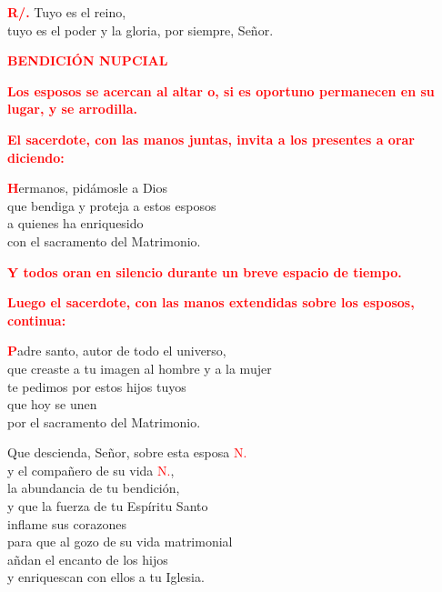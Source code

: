 \documentclass[12pt, letterpaper, spanish]{report}
\begin{document}
\Large \hspace{-0.9cm} {\bfseries \textcolor{red}{R/.}} \hspace{0.5cm} Tuyo es el reino,\\
tuyo es el poder y la gloria, por siempre, Se\~nor.\newline

\newpage

\Large {\bfseries \textcolor{red}{BENDICI\'ON NUPCIAL}} \newline

\large{\bfseries \textcolor{red}{Los esposos se acercan al altar o,
si es oportuno permanecen en su lugar, y se arrodilla.}}\newline

\large{\bfseries \textcolor{red}{El sacerdote, con las manos juntas, invita a los presentes a orar diciendo:}}

\Large \lettrine[lines=1]{\bfseries \textcolor{red}{H}}{}ermanos, pid\'amosle a Dios\\
que bendiga y proteja a estos esposos\\
a quienes ha enriquesido\\
con el sacramento del Matrimonio.\newline

\large{\bfseries \textcolor{red}{Y todos oran en silencio durante un breve espacio de tiempo.}}\newline

\large{\bfseries \textcolor{red}{Luego el sacerdote, con las manos extendidas sobre los esposos, continua:}}

\Large \lettrine[lines=1]{\bfseries \textcolor{red}{P}}{}adre santo, autor de todo el universo,\\
que creaste a tu imagen al hombre y a la mujer\\
te pedimos por estos hijos tuyos\\
que hoy se unen\\
por el sacramento del Matrimonio.\newline

Que descienda, Se\~nor, sobre esta esposa \textcolor{red}{N.}\\
y el compa\~nero de su vida \textcolor{red}{N.},\\
la abundancia de tu bendici\'on,\\
y que la fuerza de tu Esp\'iritu Santo\\
inflame sus corazones\\
para que al gozo de su vida matrimonial\\
a\~ndan el encanto de los hijos\\
y enriquescan con ellos a tu Iglesia.\newline
\end{document}
